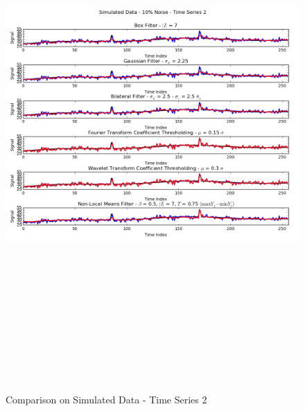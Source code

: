 \documentclass[11pt]{article}
\theoremstyle{definition}
\begin{document}
\begin{figure}[h!]
\centering
\includegraphics[width = 1 \textwidth,height = 8in]{TimeSeries2SimulatedCompare.png}
\caption{Comparison on Simulated Data - Time Series 2}
\label{timeseries2simulatedcompare}
\end{figure}
\end{document}

